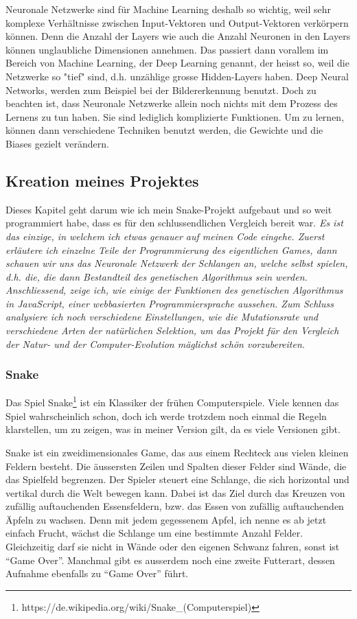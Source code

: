 \documentclass[11pt,a4paper,ngerman]{article}
\begin{document}
\bigskip
    Neuronale Netzwerke sind für Machine Learning deshalb so wichtig, weil sehr komplexe Verhältnisse zwischen Input-Vektoren und Output-Vektoren verkörpern können. Denn die Anzahl der Layers wie auch die Anzahl Neuronen in den Layers können unglaubliche Dimensionen annehmen. Das passiert dann vorallem im Bereich von Machine Learning, der Deep Learning genannt, der heisst so, weil die Netzwerke so "tief" sind, d.h. unzählige grosse Hidden-Layers haben. Deep Neural Networks, werden zum Beispiel bei der Bildererkennung benutzt. Doch zu beachten ist, dass Neuronale Netzwerke allein noch nichts mit dem Prozess des Lernens zu tun haben. Sie sind lediglich komplizierte Funktionen. Um zu lernen, können dann verschiedene Techniken benutzt werden, die Gewichte und die Biases gezielt verändern.

\subsection{Kreation meines Projektes}

Dieses Kapitel geht darum wie ich mein Snake-Projekt aufgebaut und so weit programmiert habe, dass es für den schlussendlichen Vergleich bereit war. \textit{Es ist das einzige, in welchem ich etwas genauer auf meinen Code eingehe. Zuerst erläutere ich einzelne Teile der Programmierung des eigentlichen Games, dann schauen wir uns das Neuronale Netzwerk der Schlangen an, welche selbst spielen, d.h. die, die dann Bestandteil des genetischen Algorithmus sein werden. Anschliessend, zeige ich, wie einige der Funktionen des genetischen Algorithmus in JavaScript, einer webbasierten Programmiersprache aussehen. Zum Schluss analysiere ich noch verschiedene Einstellungen, wie die Mutationsrate und verschiedene Arten der natürlichen Selektion, um das Projekt für den Vergleich der Natur- und der Computer-Evolution mäglichst schön vorzubereiten.}

\subsubsection{Snake}

Das Spiel Snake\footnote{https://de.wikipedia.org/wiki/Snake\_(Computerspiel)} ist ein Klassiker der frühen Computerspiele. Viele kennen das Spiel wahrscheinlich schon, doch ich werde trotzdem noch einmal die Regeln klarstellen, um zu zeigen, was in meiner Version gilt, da es viele Versionen gibt.

Snake ist ein zweidimensionales Game, das aus einem Rechteck aus vielen kleinen Feldern besteht. Die äussersten Zeilen und Spalten dieser Felder sind Wände, die das Spielfeld begrenzen. Der Spieler steuert eine Schlange, die sich horizontal und vertikal durch die Welt bewegen kann. Dabei ist das Ziel durch das Kreuzen von zufällig auftauchenden Essensfeldern, bzw. das Essen von zufällig auftauchenden Äpfeln zu wachsen. Denn mit jedem gegessenem Apfel, ich nenne es ab jetzt einfach Frucht, wächst die Schlange um eine bestimmte Anzahl Felder. Gleichzeitig darf sie nicht in Wände oder den eigenen Schwanz fahren, sonst ist \enquote{Game Over}. Manchmal gibt es ausserdem noch eine zweite Futterart, dessen Aufnahme ebenfalls zu \enquote{Game Over} führt.
\end{document}
